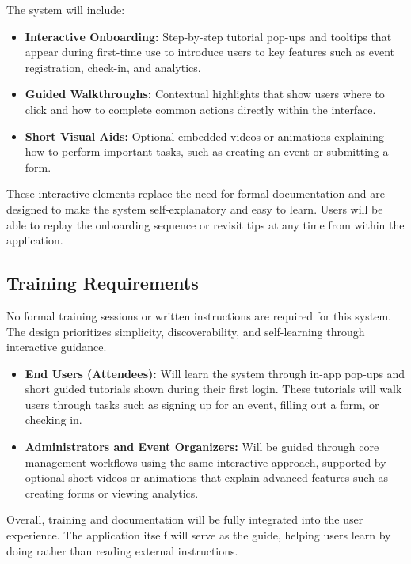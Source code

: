 \documentclass[12pt]{article}
\begin{document}
The system will include:
\begin{itemize}
    \item \textbf{Interactive Onboarding:}
    Step-by-step tutorial pop-ups and tooltips that appear during first-time use to introduce users to key features such as event registration, check-in, and analytics.

    \item \textbf{Guided Walkthroughs:}
    Contextual highlights that show users where to click and how to complete common actions directly within the interface.

    \item \textbf{Short Visual Aids:}
    Optional embedded videos or animations explaining how to perform important tasks, such as creating an event or submitting a form.
\end{itemize}

These interactive elements replace the need for formal documentation and are designed to make the system self-explanatory and easy to learn.
Users will be able to replay the onboarding sequence or revisit tips at any time from within the application.

\subsection{Training Requirements}

No formal training sessions or written instructions are required for this system.
The design prioritizes simplicity, discoverability, and self-learning through interactive guidance.

\begin{itemize}
    \item \textbf{End Users (Attendees):}
    Will learn the system through in-app pop-ups and short guided tutorials shown during their first login.
    These tutorials will walk users through tasks such as signing up for an event, filling out a form, or checking in.

    \item \textbf{Administrators and Event Organizers:}
    Will be guided through core management workflows using the same interactive approach, supported by optional short videos or animations that explain advanced features such as creating forms or viewing analytics.
\end{itemize}

Overall, training and documentation will be fully integrated into the user experience.
The application itself will serve as the guide, helping users learn by doing rather than reading external instructions.
\end{document}
